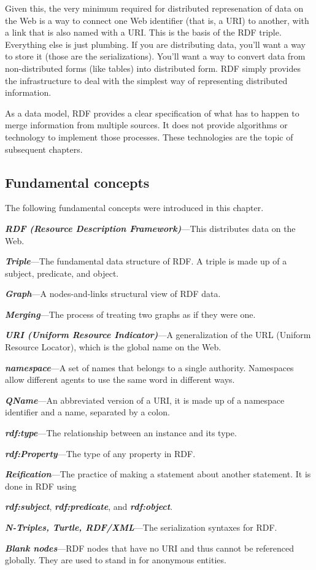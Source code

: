 Given this, the very minimum required for distributed represenation of data on the
Web is a way to connect one Web identifier (that is, a URI) to another, with a link that is also named with a URI.  This is the basis of the RDF triple.  Everything else is just plumbing.  If you are distributing data, 
you'll want a way to store it (those are the serializations).  You'll want a way to convert data
from non-distributed forms (like tables) into distributed form.  RDF simply provides the infrastructure to deal
with the simplest way of representing distributed information. 



As a data model, RDF provides a clear specification of what has to
happen to merge information from multiple sources. It does not provide
algorithms or technology to implement those processes. These
technologies are the topic of subsequent chapters.

\subsection{Fundamental concepts}

The following fundamental concepts were introduced in this chapter.

\emph{\textbf{RDF (Resource Description Framework)}}---This distributes
data on the Web.

\emph{\textbf{Triple}}---The fundamental data structure of RDF. A triple
is made up of a subject, predicate, and object.

\emph{\textbf{Graph}}---A nodes-and-links structural view of RDF data.

\emph{\textbf{Merging}}---The process of treating two graphs as if they
were one.

\emph{\textbf{URI (Uniform Resource Indicator)}}---A generalization of
the URL (Uniform Resource Locator), which is the global name on the Web.

\emph{\textbf{namespace}}---A set of names that belongs to a single authority.
Namespaces allow different agents to use the same word in different
ways.

\emph{\textbf{QName}}---An abbreviated version of a URI, it is made up of a
namespace identifier and a name, separated by a colon.

\emph{\textbf{rdf:type}}---The relationship between an instance and its type.

\emph{\textbf{rdf:Property}}---The type of any property in RDF.

\emph{\textbf{Reification}}---The practice of making a statement about another
statement. It is done in RDF using

\emph{\textbf{rdf:subject}}, \emph{\textbf{rdf:predicate}}, and \emph{\textbf{rdf:object}}.

\emph{\textbf{N-Triples, Turtle, RDF/XML}}---The serialization syntaxes for
RDF.

\emph{\textbf{Blank nodes}}---RDF nodes that have no URI and thus cannot be
referenced globally. They are used to stand in for anonymous entities.
